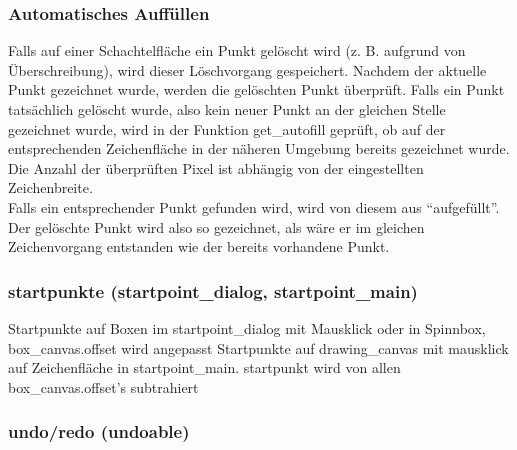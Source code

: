 \subsubsection{Automatisches Auffüllen}
\label{subsubsec:auffuellen}

Falls auf einer Schachtelfläche ein Punkt gelöscht wird (z. B. aufgrund von Überschreibung), wird dieser Löschvorgang gespeichert. Nachdem der aktuelle Punkt gezeichnet wurde, werden die gelöschten Punkt überprüft. Falls ein Punkt tatsächlich gelöscht wurde, also kein neuer Punkt an der gleichen Stelle gezeichnet wurde, wird in der Funktion get\_autofill geprüft, ob auf der entsprechenden Zeichenfläche in der näheren Umgebung bereits gezeichnet wurde. Die Anzahl der überprüften Pixel ist abhängig von der eingestellten Zeichenbreite.\\

Falls ein entsprechender Punkt gefunden wird, wird von diesem aus ``aufgefüllt''. Der gelöschte Punkt wird also so gezeichnet, als wäre er im gleichen Zeichenvorgang entstanden wie der bereits vorhandene Punkt.\\ 


\subsubsection{startpunkte (startpoint\_dialog, startpoint\_main)}
\label{subsubsec:startpunkte}

Startpunkte auf Boxen im startpoint\_dialog mit Mausklick oder in
Spinnbox, box\_canvas.offset wird angepasst Startpunkte auf drawing\_canvas
mit mausklick auf Zeichenfläche in startpoint\_main. startpunkt wird
von allen box\_canvas.offset's subtrahiert


\subsubsection{undo/redo (undoable)}
\label{subsubsec:undoRedo}

